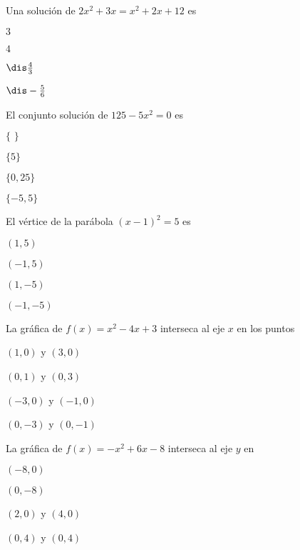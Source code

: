 \documentclass[12pt, fleqn]{article}
\begin{document}
\item Una solución de $2x^2+3x=x^2+2x+12$ es
\vp

\benu
\item[] \opc $3$
\item[] \opc $4$
\item[] \opc $\dis\frac43$
\item[] \opc $\dis-\frac{5}{6}$
\eenu
\vs

\pagebreak

\item El conjunto solución de  $125-5x^2=0$ es
\vp

\benu
\item[] \opc $\{\,\,\}$ \vp
\item[] \opc $\{5\}$ \vp
\item[] \opc $\{0,25\}$ \vp
\item[] \opc $\{-5,5\}$
\eenu
\vs

\item El vértice de la parábola $(x-1)^2=5$ es
\vp

\benu
\item[] \opc $(1,5)$ \vp
\item[] \opc $(-1,5)$ \vp
\item[] \opc $(1,-5)$ \vp
\item[] \opc $(-1,-5)$
\eenu
\vs



\item La gráfica de $f(x)=x^2-4x+3$ interseca al eje $x$ en los puntos \vp

\benu
\item[] \opc $(1,0)$ y $(3,0)$ \vp
\item[] \opc $(0,1)$ y $(0,3)$ \vp
\item[] \opc $(-3,0)$ y $(-1,0)$ \vp
\item[] \opc $(0,-3)$ y $(0,-1)$
\eenu\vs

\item La gráfica de $f(x)=-x^2+6x-8$ interseca al eje $y$ en \vp

\benu
\item[] \opc $(-8,0)$ \vp
\item[] \opc $(0,-8)$ \vp
\item[] \opc $(2,0)$ y $(4,0)$ \vp
\item[] \opc $(0,4)$ y $(0,4)$
\eenu\vs
\end{document}
